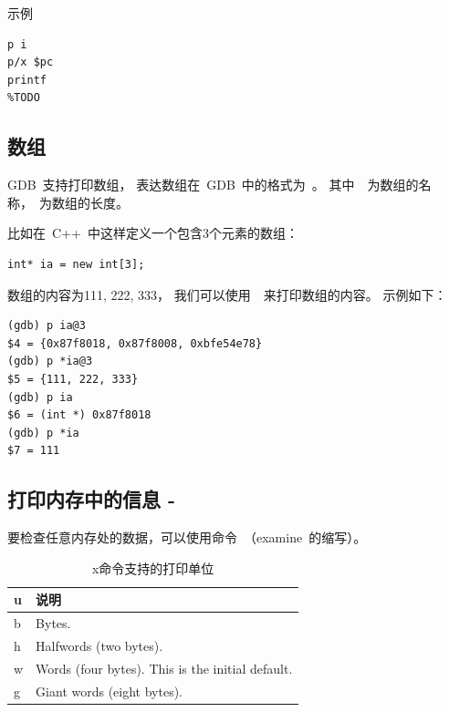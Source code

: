 示例
\begin{lstlisting}
p i
p/x $pc
printf
%TODO
\end{lstlisting}

\subsection{数组}

GDB~支持打印数组，
表达数组在~GDB~中的格式为~。
其中~~为数组的名称，~为数组的长度。

比如在~C++~中这样定义一个包含3个元素的数组：
\begin{lstlisting}
int* ia = new int[3];
\end{lstlisting}
数组的内容为{111, 222, 333}，
我们可以使用~~来打印数组的内容。
示例如下：

\begin{lstlisting}
(gdb) p ia@3
$4 = {0x87f8018, 0x87f8008, 0xbfe54e78}
(gdb) p *ia@3
$5 = {111, 222, 333}
(gdb) p ia
$6 = (int *) 0x87f8018
(gdb) p *ia
$7 = 111
\end{lstlisting}


\subsection{打印内存中的信息 - }

要检查任意内存处的数据，可以使用命令~（examine~的缩写）。

\noindent
{}





\begin{table}
\begin{tabularx}{400pt}{l|X}
\hline
\hline
u & 说明 \\
\hline
b & Bytes.  \\
h & Halfwords (two bytes).  \\
w & Words (four bytes). This is the initial default. \\
g & Giant words (eight bytes). \\
\hline
\hline
\end{tabularx}
\caption{x命令支持的打印单位}\label{tab:x_param_unit}
\end{table}


